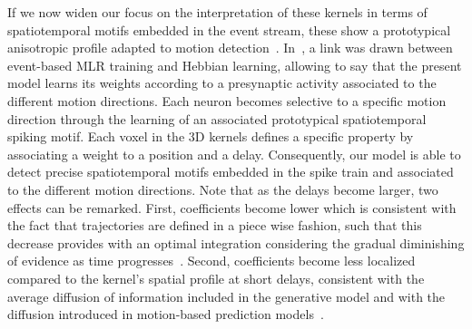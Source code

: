 \documentclass[default]{sn-jnl}%
\theoremstyle{thmstyleone}%
\theoremstyle{thmstyletwo}%
\theoremstyle{thmstylethree}%
\begin{document}
If we now widen our focus on the interpretation of these kernels in terms of spatiotemporal motifs embedded in the event stream, these show a prototypical anisotropic profile adapted to motion detection~\citep{kaplan_anisotropic_2013}. In~\citep{grimaldi_robust_2022}, a link was drawn between event-based MLR training and Hebbian learning, allowing to say that the present model learns its weights according to a presynaptic activity associated to the different motion directions. Each neuron becomes selective to a specific motion direction through the learning of an associated prototypical spatiotemporal spiking motif. Each voxel in the 3D kernels defines a specific property by associating a weight to a position and a delay. Consequently, our model is able to detect precise spatiotemporal motifs embedded in the spike train and associated to the different motion directions. Note that as the delays become larger, two effects can be remarked. First, coefficients become lower which is consistent with the fact that trajectories are defined in a piece wise fashion, such that this decrease provides with an optimal integration considering the gradual diminishing of evidence as time progresses~\citep{Pasturel2020}. Second, coefficients become less localized compared to the kernel's spatial profile at short delays, consistent with the average diffusion of information included in the generative model and with the diffusion introduced in motion-based prediction models~\citep{perrinet_motion-based_2012,khoei_flash-lag_2017}. %
%
%
\end{document}
